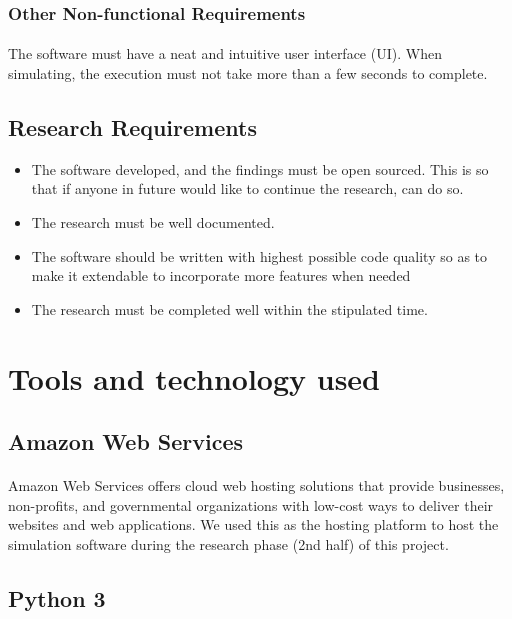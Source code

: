 \documentclass[12pt, a4paper]{extarticle}
\begin{document}
            \subsubsection{Other Non-functional Requirements}
                \paragraph{} The software must have a neat and intuitive user interface (UI). When simulating, the execution must not take more than a few seconds to complete.
        \newpage
        \subsection{Research Requirements}
            \begin{itemize}
                \item The software developed, and the findings must be open sourced. This is so that if anyone in future would like to continue the research, can do so.
                \item The research must be well documented.
                \item The software should be written with highest possible code quality so as to make it extendable to incorporate more features when needed
                \item The research must be completed well within the stipulated time.
            \end{itemize}
    
    \newpage
    \section{Tools and technology used}
        \subsection{Amazon Web Services}
            \paragraph{} Amazon Web Services offers cloud web hosting solutions that provide businesses, non-profits, and governmental organizations with low-cost ways to deliver their websites and web applications. We used this as the hosting platform to host the simulation software during the research phase (2nd half) of this project.
        \subsection{Python 3}
\end{document}
